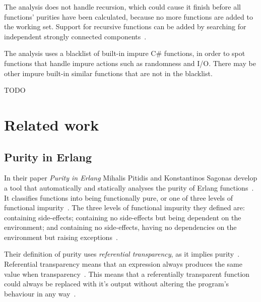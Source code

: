 \documentclass[a4paper,12pt]{article}
\begin{document}

The analysis does not handle recursion, which could cause it finish before all functions' purities have been calculated, because no more functions are added to the working set. Support for recursive functions can be added by searching for independent strongly connected components~\cite{pitidis2010purity}.


The analysis uses a blacklist of built-in impure C\# functions, in order to spot functions that handle impure actions such as randomness and I/O. There may be other impure built-in similar functions that are not in the blacklist.

TODO

\section{Related work} \label{sec:Related work} %

\subsection{Purity in Erlang} \label{sub:Purity-in-Erlang}
In their paper \textit{Purity in Erlang} Mihalis Pitidis and Konstantinos Sagonas develop a tool that automatically and statically analyses the purity of Erlang functions~\cite{pitidis2010purity}. It classifies functions into being functionally pure, or one of three levels of functional impurity~\cite{pitidis2010purity}.
The three levels of functional impurity they defined are: containing side-effects; containing no side-effects but being dependent on the environment; and containing no side-effects, having no dependencies on the environment but raising exceptions~\cite{pitidis2010purity}.

Their definition of purity uses \textit{referential transparency}, as it implies purity~\cite{pitidis2010purity}. Referential transparency means that an expression always produces the same value when transparency~\cite{pitidis2010purity}. This means that a referentially transparent function could always be replaced with it's output without altering the program's behaviour in any way~\cite{pitidis2010purity}.
\end{document}
